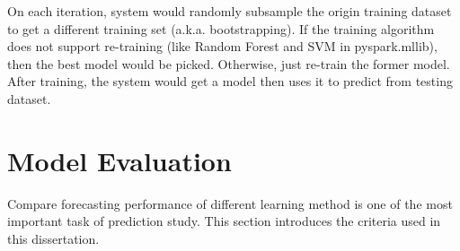 On each iteration, system would randomly subsample the origin training dataset to get a different training set (a.k.a. bootstrapping). If the training algorithm does not support re-training (like Random Forest and SVM in pyspark.mllib), then the best model would be picked. Otherwise, just re-train the former model.\\


After training, the system would get a model then uses it to predict from testing dataset.




\section{Model Evaluation}
Compare forecasting performance of different learning method is one of the most important task of prediction study. This section introduces the criteria used in this dissertation.\\


